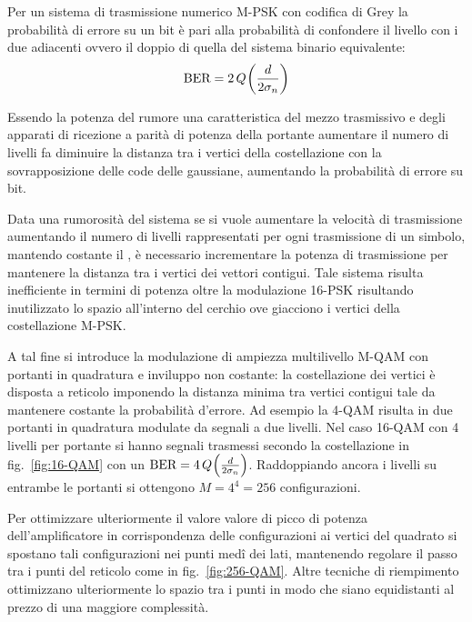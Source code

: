 Per un sistema di trasmissione numerico M-\ac{PSK} con codifica di Grey la probabilità di errore su un bit è pari alla probabilità di confondere il livello con i due adiacenti ovvero il doppio di quella del sistema binario equivalente:
\begin{equation}
\text{BER}=2\,{Q}^{}\!\left({\frac{d}{2\sigma_n}}\right)
\label{eq:qam_mpsk_biterrorrate}
\end{equation}

Essendo la potenza del rumore una caratteristica del mezzo trasmissivo e degli apparati di ricezione a parità di potenza della portante aumentare il numero di livelli fa diminuire la distanza tra i vertici della costellazione con la sovrapposizione delle code delle gaussiane, aumentando la probabilità di errore su bit.

Data una rumorosità del sistema se si vuole aumentare la velocità di trasmissione aumentando il numero di livelli rappresentati per ogni trasmissione di un simbolo, mantendo costante il , è necessario incrementare la potenza di trasmissione per mantenere la distanza tra i vertici dei vettori contigui. 
Tale sistema risulta inefficiente in termini di potenza oltre la modulazione 16-\ac{PSK} risultando inutilizzato lo spazio all'interno del cerchio ove giacciono i vertici della costellazione M-\ac{PSK}.

A tal fine si introduce la modulazione di ampiezza multilivello M-\ac{QAM} con portanti in quadratura e inviluppo non costante: la costellazione dei vertici è disposta a reticolo imponendo la distanza minima tra vertici contigui tale da mantenere costante la probabilità d'errore. Ad esempio la 4-\ac{QAM} risulta in due portanti in quadratura modulate da segnali a due livelli. Nel caso 16-\ac{QAM} con 4 livelli per portante si hanno segnali trasmessi secondo la costellazione in fig.~\ref{fig:16-QAM} con un $\text{BER}=4\,{Q}^{}\!\left({\frac{d}{2\sigma_n}}\right)$. Raddoppiando ancora i livelli su entrambe le portanti si ottengono $M=4^4=256$ configurazioni. 

Per ottimizzare ulteriormente il valore valore di picco di potenza dell'amplificatore in corrispondenza delle configurazioni ai vertici del quadrato si spostano tali configurazioni nei punti med\^{i} dei lati, mantenendo regolare il passo tra i punti del reticolo come in fig.~\ref{fig:256-QAM}. Altre tecniche di riempimento ottimizzano ulteriormente lo spazio tra i punti in modo che siano equidistanti al prezzo di una maggiore complessità.

